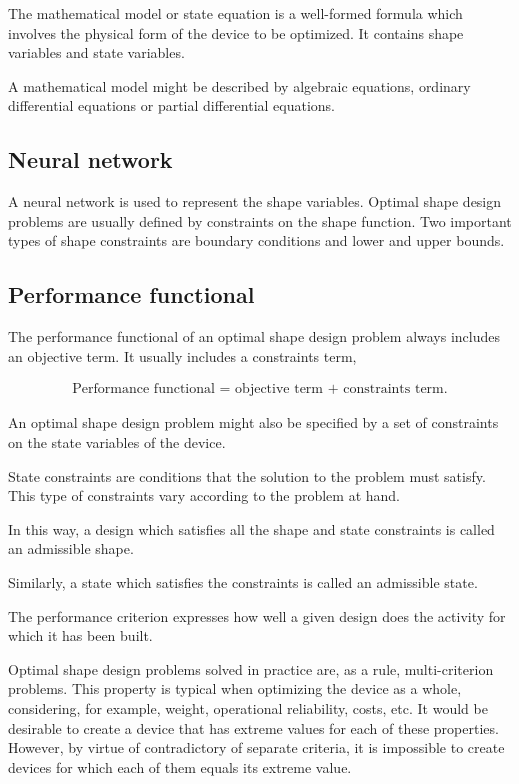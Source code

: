 The mathematical model or state equation is a well-formed formula which involves the
physical form of the device to be optimized. 
It contains shape variables and state variables. 

A mathematical model might be described by algebraic equations, ordinary differential equations or partial differential equations. 

\subsection*{Neural network}

A neural network is used to represent the shape variables. 
Optimal shape design problems are usually defined by constraints on the shape function. 
Two important types of shape constraints are boundary conditions and lower and upper bounds. 

\subsection*{Performance functional}

The performance functional of an optimal shape design problem always includes an objective term.
It usually includes a constraints term,  

\begin{eqnarray}\nonumber
\text{Performance functional = objective term + constraints term}. 
\end{eqnarray}


An optimal shape design problem might also be specified by a set of
constraints on the state variables of the
device.

State constraints are conditions that the solution to the problem
must satisfy. This type of constraints vary according to the problem
at hand.

In this way, a design which satisfies all the shape and state
constraints is called an admissible shape.

Similarly, a state which satisfies the constraints is called an
admissible state.

The performance criterion expresses how well a given design does the
activity for which it has been built.


Optimal shape design problems solved in practice are, as a rule,
multi-criterion problems. This property is
typical when optimizing the device as a whole, considering, for
example, weight, operational reliability, costs, etc. It would be
desirable to create a device that has extreme values for each of
these properties. However, by virtue of contradictory of separate
criteria, it is impossible to create devices for which each of them
equals its extreme value.


